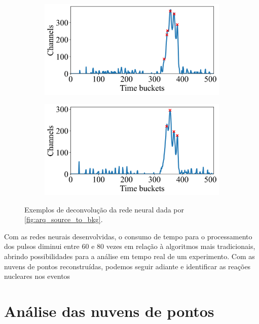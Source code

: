 \documentclass[a4paper,12pt,oneside]{book}
\begin{document}
\begin{figure}[H]
\begin{subfigure}[b]{0.49\textwidth}
        \centering
        \includegraphics[scale=0.425]{figs/np_exs3.png}
        \caption{}
        \label{subfig:exs_n_peaks_3}
    \end{subfigure}%
    \hfill
    \begin{subfigure}[b]{0.465\textwidth}
        \centering
        \includegraphics[scale=0.425]{figs/np_exs4.png}
        \caption{}
        \label{subfig:exs_n_peaks_4}
    \end{subfigure}
\caption{Exemplos de deconvolução da rede neural dada por \ref{fig:arq_source_to_bkg}.}
\label{fig:exs_n_peaks}
\end{figure}

\par Com as redes neurais desenvolvidas, o consumo de tempo para o processamento dos pulsos diminui entre 60 e 80 vezes em relação à algoritmos mais tradicionais, abrindo possibilidades para a análise em tempo real de um experimento. Com as nuvens de pontos reconstruídas, podemos seguir adiante e identificar as reações nucleares nos eventos

\chapter{Análise das nuvens de pontos}
\end{document}
